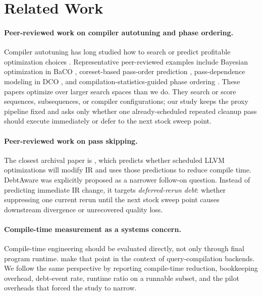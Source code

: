 \documentclass{article}
\begin{document}
\section{Related Work}
\label{sec:related}

\paragraph{Peer-reviewed work on compiler autotuning and phase ordering.}
Compiler autotuning has long studied how to search or predict profitable optimization choices \citep{ashouri2018survey}. Representative peer-reviewed examples include Bayesian optimization in BaCO \citep{hellsten2023baco}, coreset-based pass-order prediction \citep{liang2023learning}, pass-dependence modeling in DCO \citep{liu2024dco}, and compilation-statistics-guided phase ordering \citep{zhao2025citroen}. These papers optimize over larger search spaces than we do. They search or score sequences, subsequences, or compiler configurations; our study keeps the proxy pipeline fixed and asks only whether one already-scheduled repeated cleanup pass should execute immediately or defer to the next stock sweep point.

\paragraph{Peer-reviewed work on pass skipping.}
The closest archival paper is \citet{jayatilaka2021towards}, which predicts whether scheduled LLVM optimizations will modify IR and uses those predictions to reduce compile time. DebtAware was explicitly proposed as a narrower follow-on question. Instead of predicting immediate IR change, it targets \emph{deferred-rerun debt}: whether suppressing one current rerun until the next stock sweep point causes downstream divergence or unrecovered quality loss.

\paragraph{Compile-time measurement as a systems concern.}
Compile-time engineering should be evaluated directly, not only through final program runtime. \citet{engelke2024compiletime} make that point in the context of query-compilation backends. We follow the same perspective by reporting compile-time reduction, bookkeeping overhead, debt-event rate, runtime ratio on a runnable subset, and the pilot overheads that forced the study to narrow.
\end{document}
